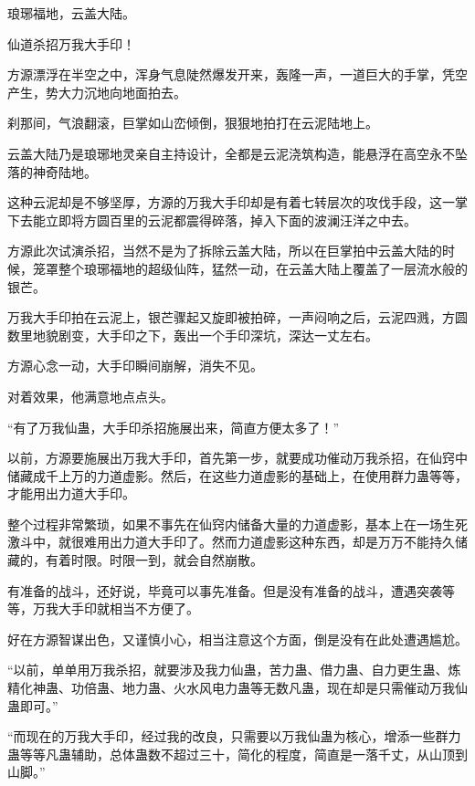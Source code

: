 
\begin{this_body}

琅琊福地，云盖大陆。

仙道杀招万我大手印！

方源漂浮在半空之中，浑身气息陡然爆发开来，轰隆一声，一道巨大的手掌，凭空产生，势大力沉地向地面拍去。

刹那间，气浪翻滚，巨掌如山峦倾倒，狠狠地拍打在云泥陆地上。

云盖大陆乃是琅琊地灵亲自主持设计，全都是云泥浇筑构造，能悬浮在高空永不坠落的神奇陆地。

这种云泥却是不够坚厚，方源的万我大手印却是有着七转层次的攻伐手段，这一掌下去能立即将方圆百里的云泥都震得碎落，掉入下面的波澜汪洋之中去。

方源此次试演杀招，当然不是为了拆除云盖大陆，所以在巨掌拍中云盖大陆的时候，笼罩整个琅琊福地的超级仙阵，猛然一动，在云盖大陆上覆盖了一层流水般的银芒。

万我大手印拍在云泥上，银芒骤起又旋即被拍碎，一声闷响之后，云泥四溅，方圆数里地貌剧变，大手印之下，轰出一个手印深坑，深达一丈左右。

方源心念一动，大手印瞬间崩解，消失不见。

对着效果，他满意地点点头。

“有了万我仙蛊，大手印杀招施展出来，简直方便太多了！”

以前，方源要施展出万我大手印，首先第一步，就要成功催动万我杀招，在仙窍中储藏成千上万的力道虚影。然后，在这些力道虚影的基础上，在使用群力蛊等等，才能用出力道大手印。

整个过程非常繁琐，如果不事先在仙窍内储备大量的力道虚影，基本上在一场生死激斗中，就很难用出力道大手印了。然而力道虚影这种东西，却是万万不能持久储藏的，有着时限。时限一到，就会自然崩散。

有准备的战斗，还好说，毕竟可以事先准备。但是没有准备的战斗，遭遇突袭等等，万我大手印就相当不方便了。

好在方源智谋出色，又谨慎小心，相当注意这个方面，倒是没有在此处遭遇尴尬。

“以前，单单用万我杀招，就要涉及我力仙蛊，苦力蛊、借力蛊、自力更生蛊、炼精化神蛊、功倍蛊、地力蛊、火水风电力蛊等无数凡蛊，现在却是只需催动万我仙蛊即可。”

“而现在的万我大手印，经过我的改良，只需要以万我仙蛊为核心，增添一些群力蛊等等凡蛊辅助，总体蛊数不超过三十，简化的程度，简直是一落千丈，从山顶到山脚。”


\end{this_body}

